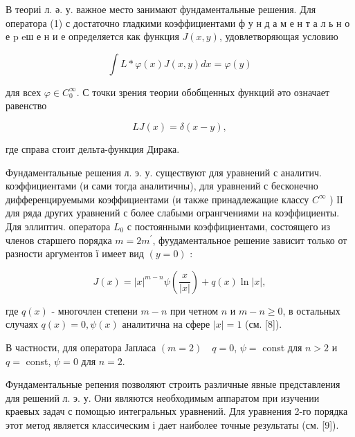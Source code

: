 \documentclass[10pt]{article}
\begin{document}
В теориі л. ә. у. важное место занимают фундаментальные решения. Для оператора (1) с достаточно гладкими коэффициентами ф у н д а м е н т а л ь н о е p eш е н и е определяется как функция $J(x, y)$, удовлетворяющая условию



\[

\int L * \varphi(x) J(x, y) d x=\varphi(y)

\]



для всех $\varphi \in C_{0}^{\infty}$. С точки зрения теории обобщенных функций әто означает равенство



\[

L J(x)=\delta(x-y),

\]



где справа стоит дельта-функция Дирака.



Фундаментальные решения л. э. у. существуют для уравнений с аналитич. коэффициентами (и сами тогда аналитичны), для уравнений с бесконечно дифференцируемыми коэффициентами (и также принадлежащие классу $C^{\infty}$ ) ІІ для ряда других уравнений с более слабыми огрангчениями на коэффициенты. Для эллиптич. оператора $L_{0}$ с постоянными коэффициентами, состоящего из членов старшего порядка $m=2 m^{\prime}$, фуудаментальное решение зависит только от разности аргументов ї имеет вид $(y=0)$ :



\[

J(x)=|x|^{m-n} \psi\left(\frac{x}{|x|}\right)+q(x) \ln |x|,

\]



где $q(x)$ - многочлен степени $m-n$ при четном $n$ и $m-n \geqslant 0$, в остальных случаях $q(x)=0, \psi(x)$ аналитична на сфере $|x|=1$ (см. [8]).



В частности, для оператора Јапласа $(m=2) \quad q=0$, $\psi=$ const для $n>2$ и $q=$ const, $\psi=0$ для $n=2$.



Фундаментальные репения позволяют строить различные явные представления для решений л. э. у. Они являются необходимым аппаратом при изучении краевых задач с помощью интегральных уравнений. Для уравнения 2-го порядка этот метод является классическим і дает наиболее точные результаты (см. [9]).
\end{document}
